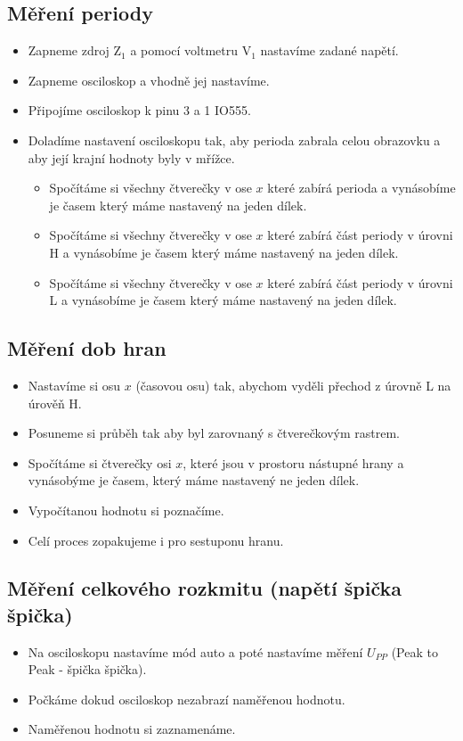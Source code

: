   \subsection{Měření periody}
    \begin{itemize}
      \item
        Zapneme zdroj Z$_1$ a pomocí voltmetru V$_1$ nastavíme zadané napětí.
      \item
        Zapneme osciloskop a vhodně jej nastavíme.
      \item
        Připojíme osciloskop k pinu 3 a 1 IO555.
      \item
        Doladíme nastavení osciloskopu tak, aby perioda zabrala celou obrazovku a aby její krajní hodnoty byly v mřížce.
        \begin{itemize}
          \item
            Spočítáme si všechny čtverečky v ose $x$ které zabírá perioda a vynásobíme je časem který máme nastavený na jeden dílek.
          \item
            Spočítáme si všechny čtverečky v ose $x$ které zabírá část periody v úrovni H a vynásobíme je časem který máme nastavený na jeden dílek.
          \item
            Spočítáme si všechny čtverečky v ose $x$ které zabírá část periody v úrovni L a vynásobíme je časem který máme nastavený na jeden dílek.
        \end{itemize}
    \end{itemize}
  
  \subsection{Měření dob hran}
    \begin{itemize}
      \item
        Nastavíme si osu $x$ (časovou osu) tak, abychom vyděli přechod z úrovně L na úrověň H.
      \item
        Posuneme si průběh tak aby byl zarovnaný s čtverečkovým rastrem.
      \item
        Spočítáme si čtverečky osi $x$, které jsou v prostoru nástupné hrany a vynásobýme je časem, který máme nastavený ne jeden dílek.
      \item
        Vypočítanou hodnotu si poznačíme.
      \item
        Celí proces zopakujeme i pro sestuponu hranu. 
    \end{itemize}
  
  \subsection{Měření celkového rozkmitu (napětí špička špička)}
    \begin{itemize}
      \item
        Na osciloskopu nastavíme mód auto a poté nastavíme měření $U_{PP}$ (Peak to Peak - špička špička).
      \item
        Počkáme dokud osciloskop nezabrazí naměřenou hodnotu.
      \item
        Naměřenou hodnotu si zaznamenáme.
    \end{itemize}
    
